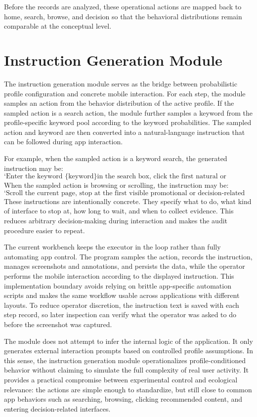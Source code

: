 Before the records are analyzed, these operational actions are mapped back to home, search, browse, and decision so that the behavioral distributions remain comparable at the conceptual level.

\section{Instruction Generation Module}

The instruction generation module serves as the bridge between probabilistic profile configuration and concrete mobile interaction. For each step, the module samples an action from the behavior distribution of the active profile. If the sampled action is a search action, the module further samples a keyword from the profile-specific keyword pool according to the keyword probabilities. The sampled action and keyword are then converted into a natural-language instruction that can be followed during app interaction.

For example, when the sampled action is a keyword search, the generated instruction may be:
\[
\text{`Enter the keyword \{keyword\} in the search box, click the first natural or recommended result, wait for three seconds, and take a screenshot.''}
\]
When the sampled action is browsing or scrolling, the instruction may be:
\[
\text{`Scroll the current page, stop at the first visible promotional or decision-related interface, wait for three seconds, and take a screenshot.''}
\]
These instructions are intentionally concrete. They specify what to do, what kind of interface to stop at, how long to wait, and when to collect evidence. This reduces arbitrary decision-making during interaction and makes the audit procedure easier to repeat.

The current workbench keeps the executor in the loop rather than fully automating app control. The program samples the action, records the instruction, manages screenshots and annotations, and persists the data, while the operator performs the mobile interaction according to the displayed instruction. This implementation boundary avoids relying on brittle app-specific automation scripts and makes the same workflow usable across applications with different layouts. To reduce operator discretion, the instruction text is saved with each step record, so later inspection can verify what the operator was asked to do before the screenshot was captured.

The module does not attempt to infer the internal logic of the application. It only generates external interaction prompts based on controlled profile assumptions. In this sense, the instruction generation module operationalizes profile-conditioned behavior without claiming to simulate the full complexity of real user activity. It provides a practical compromise between experimental control and ecological relevance: the actions are simple enough to standardize, but still close to common app behaviors such as searching, browsing, clicking recommended content, and entering decision-related interfaces.

